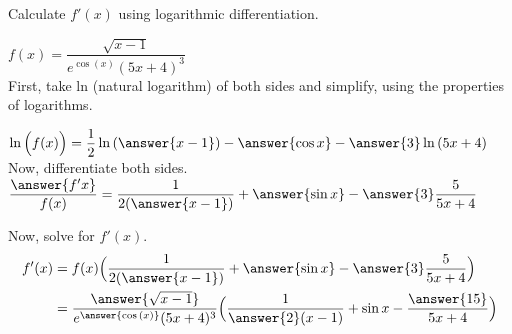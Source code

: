 \documentclass{ximera}
\author{Nela Lakos}
\begin{document}
\begin{exercise}

Calculate $f'(x)$ using logarithmic differentiation. 

 $f(x)=\dfrac{\sqrt{x-1}}{e^{\cos{(x)}}(5x+4)^3}$\\

First, take ln (natural logarithm) of both sides and simplify, using the properties of logarithms.

$\ln{\Bigl(f(x)\Bigr)}=
\dfrac{1}{2}\ln{(\answer{x-1})}-\answer{\cos{x}}-\answer{3}\ln{(5x+4)}$ \\

Now, differentiate both sides.\\

   $ \dfrac{\answer{f'{x}}}{f(x)} =\dfrac{1}{2(\answer{x-1})}+\answer{\sin{x}}-\answer{3}\dfrac{5}{5x+4}$

Now, solve for $f'(x)$.
\begin{align*}
f'(x)&=f(x)\Bigl(\dfrac{1}{2(\answer{x-1})}+\answer{\sin{x}}-\answer{3}\dfrac{5}{5x+4}\Bigr)\\
&=\dfrac{\answer{\sqrt{x-1}}}{e^{\answer{\cos{(x)}}}(5x+4)^3}\Bigl(\dfrac{1}{\answer{2}(x-1)}+\sin{x}-\dfrac{\answer{15}}{5x+4}\Bigr)
\end{align*}
\end{exercise}
\end{document}
